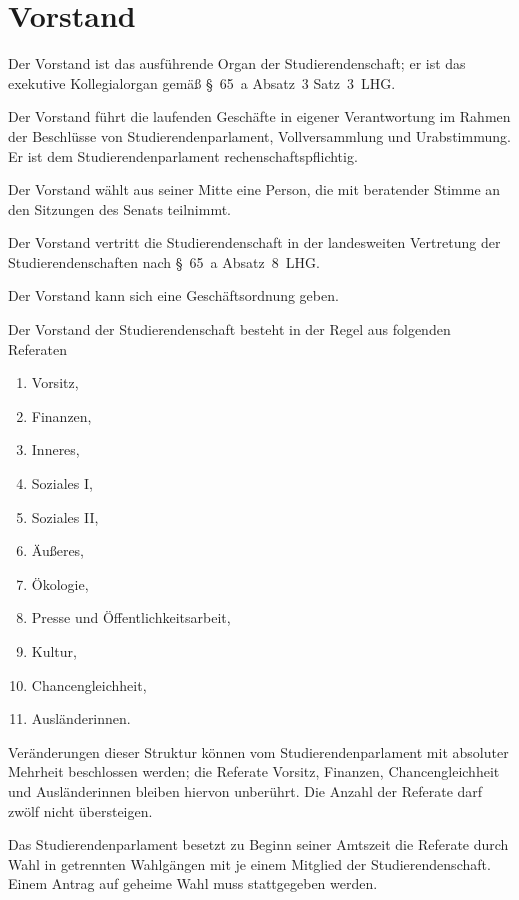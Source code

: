 %
%

\parnumberfalse \section{Vorstand} \parnumbertrue


Der Vorstand ist das ausführende Organ der Studierendenschaft; er ist das exekutive Kollegialorgan gemäß §~65~a Absatz~3 Satz~3~LHG. 

Der Vorstand führt die laufenden Geschäfte in eigener Verantwortung im Rahmen der Beschlüsse von Studierendenparlament, Vollversammlung und Urabstimmung. Er ist dem Studierendenparlament rechenschaftspflichtig.

Der Vorstand wählt aus seiner Mitte eine Person, die mit beratender Stimme an den Sitzungen des Senats teilnimmt.

Der Vorstand vertritt die Studierendenschaft in der landesweiten Vertretung der Studierendenschaften nach §~65~a Absatz~8~LHG.

Der Vorstand kann sich eine Geschäftsordnung geben.


 \label{vorstand:zusammensetzung}

Der Vorstand der Studierendenschaft besteht in der Regel aus folgenden Referaten \label{vorstand:zusammensetzung:regel}
\begin{enumerate}
\item Vorsitz,
\item Finanzen,
\item Inneres,
\item Soziales I,
\item Soziales II,
\item Äußeres,
\item Ökologie,
\item Presse und Öffentlichkeitsarbeit,
\item Kultur,
\item Chancengleichheit,
\item Ausländerinnen.
\end{enumerate}
Veränderungen dieser Struktur können vom Studierendenparlament mit absoluter Mehrheit beschlossen werden; die Referate Vorsitz, Finanzen, Chancengleichheit und Ausländerinnen bleiben hiervon unberührt. Die Anzahl der Referate darf zwölf nicht übersteigen.

Das Studierendenparlament besetzt zu Beginn seiner Amtszeit die Referate durch Wahl in getrennten Wahlgängen mit je einem Mitglied der Studierendenschaft. Einem Antrag auf geheime Wahl muss stattgegeben werden\label{vorstand:zusammensetzung:wahl}.


